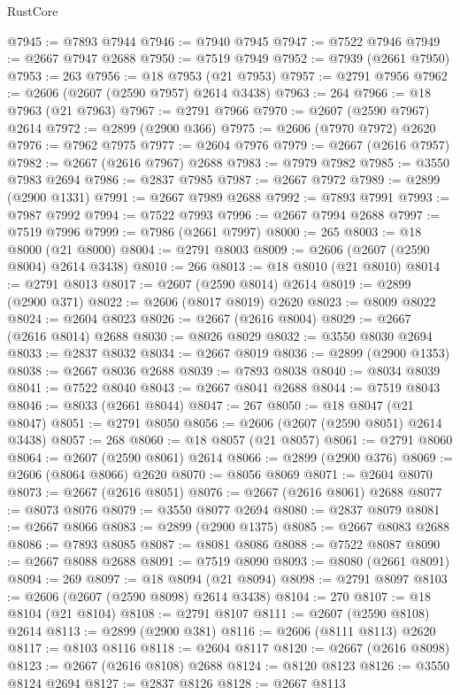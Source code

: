 \begin{lexlean}{RustCore}
\begin{coremodule}
@7945 := @7893 @7944
@7946 := @7940 @7945
@7947 := @7522 @7946
@7949 := @2667 @7947 @2688
@7950 := @7519 @7949
@7952 := @7939 (@2661 @7950)
@7953 := 263
@7956 := @18 @7953 (@21 @7953)
@7957 := @2791 @7956
@7962 := @2606 (@2607 (@2590 @7957) @2614 @3438)
@7963 := 264
@7966 := @18 @7963 (@21 @7963)
@7967 := @2791 @7966
@7970 := @2607 (@2590 @7967) @2614
@7972 := @2899 (@2900 @366)
@7975 := @2606 (@7970 @7972) @2620
@7976 := @7962 @7975
@7977 := @2604 @7976
@7979 := @2667 (@2616 @7957)
@7982 := @2667 (@2616 @7967) @2688
@7983 := @7979 @7982
@7985 := @3550 @7983 @2694
@7986 := @2837 @7985
@7987 := @2667 @7972
@7989 := @2899 (@2900 @1331)
@7991 := @2667 @7989 @2688
@7992 := @7893 @7991
@7993 := @7987 @7992
@7994 := @7522 @7993
@7996 := @2667 @7994 @2688
@7997 := @7519 @7996
@7999 := @7986 (@2661 @7997)
@8000 := 265
@8003 := @18 @8000 (@21 @8000)
@8004 := @2791 @8003
@8009 := @2606 (@2607 (@2590 @8004) @2614 @3438)
@8010 := 266
@8013 := @18 @8010 (@21 @8010)
@8014 := @2791 @8013
@8017 := @2607 (@2590 @8014) @2614
@8019 := @2899 (@2900 @371)
@8022 := @2606 (@8017 @8019) @2620
@8023 := @8009 @8022
@8024 := @2604 @8023
@8026 := @2667 (@2616 @8004)
@8029 := @2667 (@2616 @8014) @2688
@8030 := @8026 @8029
@8032 := @3550 @8030 @2694
@8033 := @2837 @8032
@8034 := @2667 @8019
@8036 := @2899 (@2900 @1353)
@8038 := @2667 @8036 @2688
@8039 := @7893 @8038
@8040 := @8034 @8039
@8041 := @7522 @8040
@8043 := @2667 @8041 @2688
@8044 := @7519 @8043
@8046 := @8033 (@2661 @8044)
@8047 := 267
@8050 := @18 @8047 (@21 @8047)
@8051 := @2791 @8050
@8056 := @2606 (@2607 (@2590 @8051) @2614 @3438)
@8057 := 268
@8060 := @18 @8057 (@21 @8057)
@8061 := @2791 @8060
@8064 := @2607 (@2590 @8061) @2614
@8066 := @2899 (@2900 @376)
@8069 := @2606 (@8064 @8066) @2620
@8070 := @8056 @8069
@8071 := @2604 @8070
@8073 := @2667 (@2616 @8051)
@8076 := @2667 (@2616 @8061) @2688
@8077 := @8073 @8076
@8079 := @3550 @8077 @2694
@8080 := @2837 @8079
@8081 := @2667 @8066
@8083 := @2899 (@2900 @1375)
@8085 := @2667 @8083 @2688
@8086 := @7893 @8085
@8087 := @8081 @8086
@8088 := @7522 @8087
@8090 := @2667 @8088 @2688
@8091 := @7519 @8090
@8093 := @8080 (@2661 @8091)
@8094 := 269
@8097 := @18 @8094 (@21 @8094)
@8098 := @2791 @8097
@8103 := @2606 (@2607 (@2590 @8098) @2614 @3438)
@8104 := 270
@8107 := @18 @8104 (@21 @8104)
@8108 := @2791 @8107
@8111 := @2607 (@2590 @8108) @2614
@8113 := @2899 (@2900 @381)
@8116 := @2606 (@8111 @8113) @2620
@8117 := @8103 @8116
@8118 := @2604 @8117
@8120 := @2667 (@2616 @8098)
@8123 := @2667 (@2616 @8108) @2688
@8124 := @8120 @8123
@8126 := @3550 @8124 @2694
@8127 := @2837 @8126
@8128 := @2667 @8113

\end{coremodule}
\end{lexlean}
